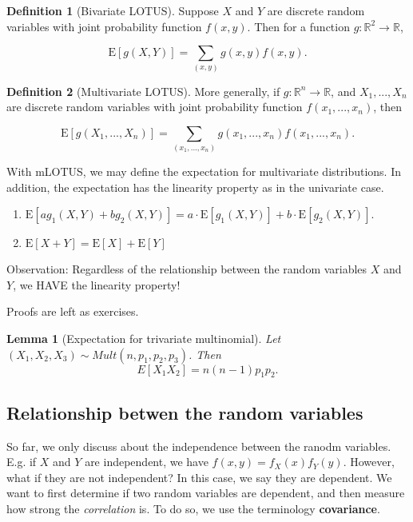 \documentclass[
]{book}
\providecommand{\tightlist}{%
  \setlength{\itemsep}{0pt}\setlength{\parskip}{0pt}}
\newtheorem{lemma}{Lemma}[chapter]
\theoremstyle{definition}
\newtheorem{definition}{Definition}[chapter]
\theoremstyle{definition}
\theoremstyle{definition}
\theoremstyle{definition}
\theoremstyle{remark}
\begin{document}
\begin{definition}[Bivariate LOTUS]
Suppose \(X\) and \(Y\) are discrete random variables with joint probability function \(f(x,y)\). Then for a function \(g: {\mathbb R}^2 \to {\mathbb R}\),

\[
\mbox{E} \left[g(X,Y) \right] = \sum_{(x,y)} g(x,y)f(x,y).
\]
\end{definition}

\begin{definition}[Multivariate LOTUS]
More generally, if \(g:  {\mathbb R}^n \to  {\mathbb R}\), and \(X_1,...,X_n\) are discrete random variables with joint probability function \(f(x_1,...,x_n)\), then

\[
\mbox{E} \left[g(X_1,...,X_n)\right] = \sum_{(x_1,...,x_n)} g(x_1,...,x_n)f(x_1,...,x_n).
\]
\end{definition}

With mLOTUS, we may define the expectation for multivariate distributions. In addition, the expectation has the linearity property as in the univariate case.

\begin{enumerate}
\def\labelenumi{\arabic{enumi}.}
\tightlist
\item
  \(\mbox{E}[ a g_1(X,Y) + b g_2(X,Y) ] = a \cdot \mbox{E}[g_1(X,Y)] + b \cdot \mbox{E}[g_2(X,Y)].\)
\item
  \(\mbox{E}[X+Y] = \mbox{E}[X] + \mbox{E}[Y]\)
\end{enumerate}

Observation: Regardless of the relationship between the random variables \(X\) and \(Y\), we HAVE the linearity property!

Proofs are left as exercises.

\begin{lemma}[Expectation for trivariate multinomial]
Let \((X_1, X_2, X_3) \sim Mult(n, p_1, p_2, p_3)\). Then
\[
E[X_1 X_2] = n(n-1) p_1 p_2.
\]
\end{lemma}

\subsection{Relationship betwen the random variables}\label{relationship-betwen-the-random-variables}

So far, we only discuss about the independence between the ranodm variables. E.g. if \(X\) and \(Y\) are independent, we have \(f(x,y) = f_X(x)f_Y(y)\). However, what if they are not independent? In this case, we say they are dependent. We want to first determine if two random variables are dependent, and then measure how strong the \emph{correlation} is. To do so, we use the terminology \textbf{covariance}.
\end{document}
